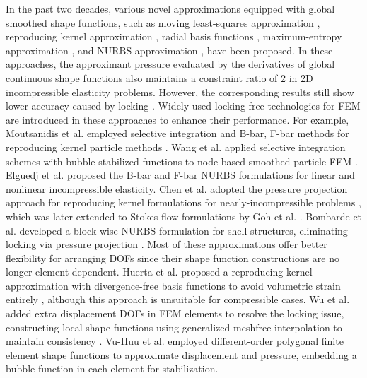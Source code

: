 In the past two decades, various novel approximations equipped with global smoothed shape functions, such as moving least-squares approximation \cite{belytschko1994}, reproducing kernel approximation \cite{liu1995}, radial basis functions \cite{chi2014,wang2020d}, maximum-entropy approximation \cite{ortiz-bernardin2015}, and NURBS approximation \cite{hughes2005,auricchio2010}, have been proposed. In these approaches, the approximant pressure evaluated by the derivatives of global continuous shape functions also maintains a constraint ratio of 2 in 2D incompressible elasticity problems. However, the corresponding results still show lower accuracy caused by locking \cite{huerta2001,dolbow1999a}. Widely-used locking-free technologies for FEM are introduced in these approaches to enhance their performance. For example, Moutsanidis et al. employed selective integration and B-bar, F-bar methods for reproducing kernel particle methods \cite{moutsanidis2020,moutsanidis2021}. Wang et al. applied selective integration schemes with bubble-stabilized functions to node-based smoothed particle FEM \cite{wang2022c}. Elguedj et al. proposed the B-bar and F-bar NURBS formulations for linear and nonlinear incompressible elasticity. Chen et al. adopted the pressure projection approach for reproducing kernel formulations for nearly-incompressible problems \cite{chen2000}, which was later extended to Stokes flow formulations by Goh et al. \cite{goh2018}. Bombarde et al. developed a block-wise NURBS formulation for shell structures, eliminating locking via pressure projection \cite{bombarde2022}. Most of these approximations offer better flexibility for arranging DOFs since their shape function constructions are no longer element-dependent. Huerta et al. proposed a reproducing kernel approximation with divergence-free basis functions to avoid volumetric strain entirely \cite{huerta2004a}, although this approach is unsuitable for compressible cases. Wu et al. added extra displacement DOFs in FEM elements to resolve the locking issue, constructing local shape functions using generalized meshfree interpolation to maintain consistency \cite{wu2012}. Vu-Huu et al. employed different-order polygonal finite element shape functions to approximate displacement and pressure, embedding a bubble function in each element for stabilization.

